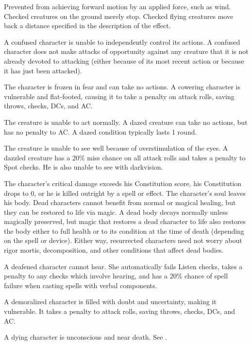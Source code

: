  Prevented from achieving forward motion by an applied force, such as wind. Checked creatures on the ground merely stop. Checked flying creatures move back a distance specified in the description of the effect.

\label{Confused} A confused character is unable to independently control its actions. \confusionexplanation A confused character does not make attacks of opportunity against any creature that it is not already devoted to attacking (either because of its most recent action or because it has just been attacked).

 The character is frozen in fear and can take no actions. A cowering character is vulnerable and flat-footed, causing it to take a  penalty on attack rolls, saving throws, checks, DCs, and AC.

 The creature is unable to act normally. A dazed creature can take no actions, but has no penalty to AC. A dazed condition typically lasts 1 round.

 The creature is unable to see well because of overstimulation of the eyes. A dazzled creature has a 20\% miss chance on all attack rolls and takes a  penalty to Spot checks. He is also unable to see with darkvision.

 The character's critical damage exceeds his Constitution score, his Constitution drops to 0, or he is killed outright by a spell or effect. The character's soul leaves his body. Dead characters cannot benefit from normal or magical healing, but they can be restored to life via magic. A dead body decays normally unless magically preserved, but magic that restores a dead character to life also restores the body either to full health or to its condition at the time of death (depending on the spell or device). Either way, resurrected characters need not worry about rigor mortis, decomposition, and other conditions that affect dead bodies.

 A deafened character cannot hear. She automatically fails Listen checks, takes a  penalty to any checks which involve hearing, and has a 20\% chance of spell failure when casting spells with verbal components.

 A demoralized character is filled with doubt and uncertainty, making it vulnerable. It takes a  penalty to attack rolls, saving throws, checks, DCs, and AC.

 A dying character is unconscious and near death. See .

